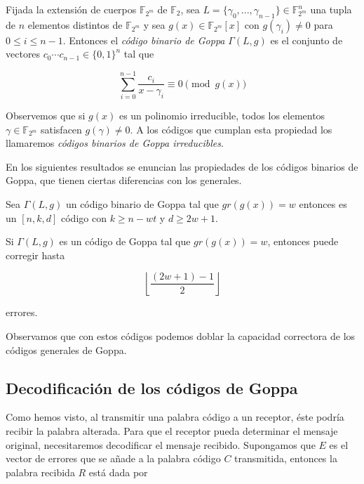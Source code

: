 \begin{definition}

    Fijada la extensión de cuerpos $\mathbb{F}_{2^m}$ de $\mathbb{F}_2$, sea $L = \{ \gamma_0, ..., \gamma_{n-1} \} \in \mathbb{F}_{2^m}^n$ una tupla de $n$ elementos distintos de $\mathbb{F}_{2^m}$ y sea $g(x) \in \mathbb{F}_{2^m}[x]$ con $g(\gamma_i) \neq 0$ para $0 \leq i \leq n - 1$. Entonces el \emph{código binario de Goppa} $\Gamma(L,g)$ es el conjunto de vectores $c_0 \cdots c_{n-1} \in \{ 0, 1 \}^n$ tal que 

    \begin{equation}
        \sum_{i=0}^{n-1} \frac{c_i}{x - \gamma_i} \equiv 0 \pmod{g(x)}
    \end{equation}
\end{definition}

Observemos que si $g(x)$ es un polinomio irreducible, todos los elementos $\gamma \in \mathbb{F}_{2^m}$ satisfacen $g(\gamma) \neq 0$. A los códigos que cumplan esta propiedad los llamaremos \emph{códigos binarios de Goppa irreducibles}.

En los siguientes resultados se enuncian las propiedades de los códigos binarios de Goppa, que tienen ciertas diferencias con los generales.

\begin{theorem}
    Sea $\Gamma(L,g)$ un código binario de Goppa tal que $gr(g(x)) = w$ entonces es un $[n, k, d]$ código con $k \geq n - wt$ y $d \geq 2w + 1$.
\end{theorem}

\begin{corollary}
    Si $\Gamma(L,g)$ es un código de Goppa tal que $gr(g(x)) = w$, entonces puede corregir hasta

    $$\left\lfloor \frac{(2w + 1) - 1}{2} \right\rfloor $$

    errores.
\end{corollary}

Observamos que con estos códigos podemos doblar la capacidad correctora de los códigos generales de Goppa.


\subsection{Decodificación de los códigos de Goppa}

Como hemos visto, al transmitir una palabra código a un receptor, éste podría recibir la palabra alterada. Para que el receptor pueda determinar el mensaje original, necesitaremos decodificar el mensaje recibido. Supongamos que $E$ es el vector de errores que se añade a la palabra código $C$ transmitida, entonces la palabra recibida $R$ está dada por

